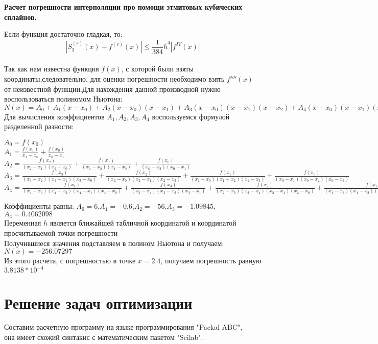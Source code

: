 \documentclass[russian,utf8,nocolumnxxxi,nocolumnxxxii]{eskdtext}
\begin{document}
\newpage
\begin{center}
    \textbf{Расчет погрешности интерполяции про помощи этмитовых кубических сплайнов.}
\end{center}
Если функция достаточно гладкая, то:\\
$$|S_3^{(r)}(x)-f^{(r)}(x)|\leqslant \frac{1}{384}\overline{h}^4|f^{IV}(x)|$$\\
Так как нам известна функция $f(x)$, с которой были взяты координаты,следовательно, для оценки погрешности необходимо взять $f''''(x)$ от неизвестной функции.Для нахождения данной производной нужно воспользоваться полиномом Ньютона:\\
$N(x)=A_0+A_1(x-x_0)+A_2(x-x_0)(x-x_1)+A_3(x-x_0)(x-x_1)(x-x_2)+A_4(x-x_0)(x-x_1)(x-x_2)(x-x_3)$\\
Для вычисления коэффициентов $A_1,A_2,A_3,A_4$ воспользуемся формулой разделенной разности:\\
\begin{center}
$A_0=f(x_0)$\\
$A_1=\frac{f(x_1)}{x_1-x_0}+\frac{f(x_0)}{x_0-x_1}$\\
$A_2=\frac{f(x_2)}{(x_2-x_1)(x_2-x_0)}+\frac{f(x_1)}{(x_1-x_2)(x_1-x_0)}+\frac{f(x_0)}{(x_0-x_2)(x_0-x_1)}$\\
$A_3=\frac{f(x_3)}{(x_3-x_2)(x_3-x_1)(x_3-x_0)}+\frac{f(x_2)}{(x_2-x_0)(x_2-x_1)(x_2-x_3)}+\frac{f(x_1)}{(x_1-x_0)(x_1-x_2)(x_1-x_3)}+\frac{f(x_0)}{(x_0-x_1)(x_0-x_2)(x_0-x_3)}$\\
$A_4=\frac{f(x_4)}{(x_4-x_3)(x_4-x_2)(x_4-x_1)(x_4-x_0)}+\frac{f(x_3)}{(x_3-x_4)(x_3-x_2)(x_3-x_1)}+\frac{f(x_2)}{(x_2-x_3)(x_2-x_4)(x_2-x_1)(x_2-x_0)}+\frac{f(x_1)}{(x_1-x_3)(x_1-x_2)(x_1-x_4)(x_1-x_0)}+\frac{f(x_0)}{(x_0-x_3)(x_0-x_2)(x_0-x_1)(x_0-x_4)}$
\end{center}
Коэффициенты равны: $A_0=6$,$A_1=-0.6$,$A_2=-56$,$A_3=-1.09845$,$A_4=0.4062098$\\
Переменная $h$ является ближайшей табличной координатой и координатой просчитываемой точки погрешности\\
Получившиеся значения подставляем в полином Ньютона и получаем:\\
$N(x)=-256.07297$\\
Из этого расчета, с погрешностью в точке $x=2.4$, получаем погрешность равную $3.8138*10^{-4}$

\newpage
\section{Решение задач оптимизации}
Составим расчетную программу на языке программирования "Packal ABC",\\
она имеет схожий синтакис с математическим пакетом "Scilab".\\
\end{document}
